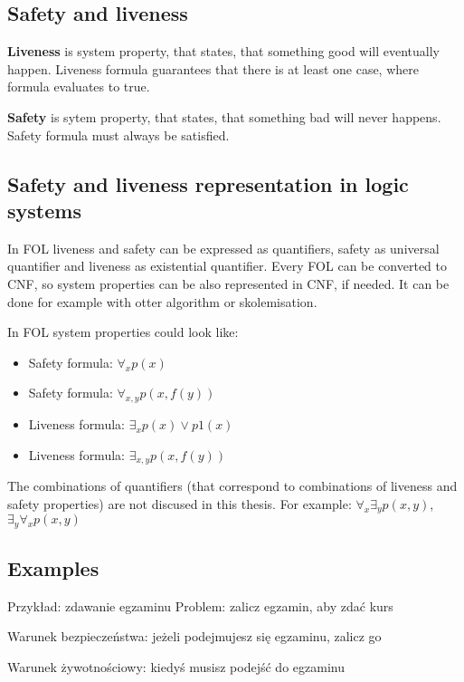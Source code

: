 \subsection{Safety and liveness}

\textbf{Liveness} \cite{Klimek99} is system property, that states, that something good will eventually happen.
Liveness formula guarantees that there is at least one case, where formula evaluates to true.

\textbf{Safety} \cite{Klimek99} is sytem property, that states, that something bad will never happens.
Safety formula must always be satisfied.

\subsection{Safety and liveness representation in logic systems}

In \gls{FOL} liveness and safety can be expressed as quantifiers, safety as universal quantifier and liveness as existential quantifier. Every \gls{FOL} can be converted to \gls{CNF}, so system properties can be also represented in \gls{CNF}, if needed. It can be done for example with otter algorithm \cite{McC-Otter-URL} or skolemisation.

In \gls{FOL} system properties could look like:
\begin{itemize}
  \item Safety formula: $\forall_x p(x)$
  \item Safety formula: $\forall_{x,y} p(x,f(y))$ 
  \item Liveness formula: $\exists_x p(x) \lor p1(x)$
  \item Liveness formula: $\exists_{x,y} p(x,f(y))$ 
\end{itemize}

The combinations of quantifiers (that correspond to combinations of liveness and safety properties) are not discused in this thesis. For example: $\forall_x \exists_y p(x, y)$, $\exists_y \forall_x p(x, y)$

\subsection{Examples}
Przykład: zdawanie egzaminu
\noindent
Problem: zalicz egzamin, aby zdać kurs

\noindent
Warunek bezpieczeństwa: jeżeli podejmujesz się egzaminu, zalicz go

\noindent
Warunek żywotnościowy: kiedyś musisz podejść do egzaminu

